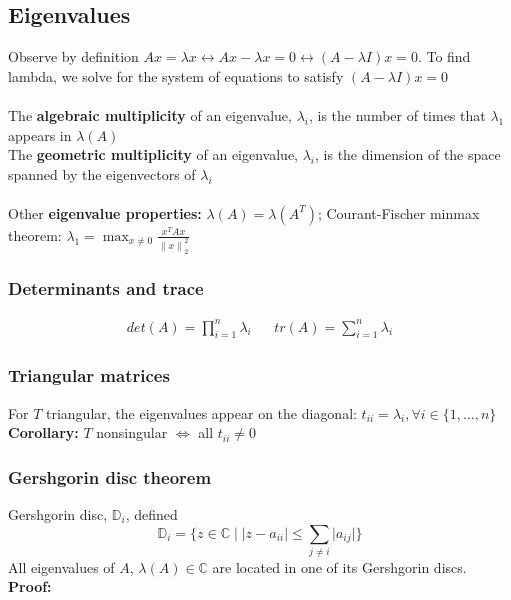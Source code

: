 \documentclass{article}
\newcommand{\norm}[2]{\left\lVert#1\right\rVert_#2}
\begin{document}
\subsection{Eigenvalues}
Observe by definition $Ax= \lambda x \longleftrightarrow Ax - \lambda x = 0 \longleftrightarrow (A - \lambda I)x = 0$. To find lambda, we solve for the system of equations to satisfy $(A - \lambda I)x = 0$\\ \\
The \textbf{algebraic multiplicity} of an eigenvalue, $\lambda_i$, is the number of times that $\lambda_1$ appears in $\lambda(A)$\\
The \textbf{geometric multiplicity} of an eigenvalue, $\lambda_i$, is the dimension of the space spanned by the eigenvectors of $\lambda_i$\\ \\
Other \textbf{eigenvalue properties:} $\lambda(A) = \lambda(A^T)$; Courant-Fischer minmax theorem: $\lambda_1 = \max_{x \neq 0}\frac{x^TAx}{\norm{x}{2}^2}$

\subsubsection{Determinants and trace}
\begin{align*}
    det(A) = \prod_{i=1}^n \lambda_i & & tr(A) = \sum_{i=1}^n \lambda_i
\end{align*}


\subsubsection{Triangular matrices}
For $T$ triangular, the eigenvalues appear on the diagonal: $t_{ii} = \lambda_i, \forall i \in \{1,\dots, n\}$\\
\textbf{Corollary:} $T$ nonsingular $\Leftrightarrow$ all $t_{ii} \neq 0$

\subsubsection{Gershgorin disc theorem}
Gershgorin disc, $\mathbb{D}_i$, defined
\begin{equation*}
    \mathbb{D}_i = \{z \in \mathbb{C} \mid \lvert z - a_{ii}\rvert \leq \sum_{j \neq i} \lvert a_{ij}\rvert\}
\end{equation*}
All eigenvalues of $A$, $\lambda(A) \in \mathbb{C}$ are located in one of its Gershgorin discs. \textbf{Proof:}
\end{document}
